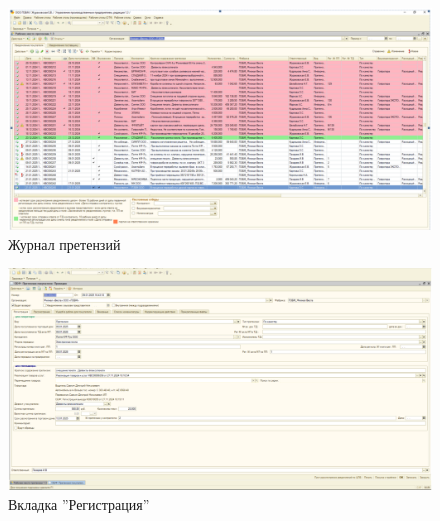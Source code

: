 \begin{figure}
\begin{center}
 \includegraphics[height=0.35\textheight, keepaspectratio]{Pics/VIIIпретензии1.png}
\end{center}
 \caption{Журнал претензий}
 \label{pic:/VIIIпретензии1}
\end{figure}

 \begin{figure}
\begin{center}
 \includegraphics[height=0.35\textheight, keepaspectratio]{Pics/VIIIпретензии2.png}
\end{center}
 \caption{Вкладка ''Регистрация''}
 \label{pic:/VIIIпретензии2}
\end{figure}





